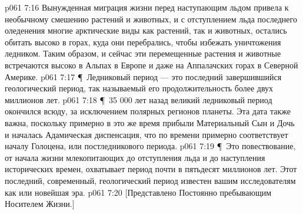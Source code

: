 \vs p061 7:16 Вынужденная миграция жизни перед наступающим льдом привела к необычному смешению растений и животных, и с отступлением льда последнего оледенения многие арктические виды как растений, так и животных, остались обитать высоко в горах, куда они перебрались, чтобы избежать уничтожения ледником. Таким образом, и сейчас эти перемещенные растения и животные встречаются высоко в Альпах в Европе и даже на Аппалачских горах в Северной Америке.
\vs p061 7:17 \P\ Ледниковый период --- это последний завершившийся геологический период, так называемый  его продолжительность более двух миллионов лет.
\vs p061 7:18 \P\ 35 000 лет назад великий ледниковый период окончился всюду, за исключением полярных регионов планеты. Эта дата также важна, поскольку примерно в это же время прибыли Материальный Сын и Дочь и началась Адамическая диспенсация, что по времени примерно соответствует началу Голоцена, или постледникового периода.
\vs p061 7:19 \P\ Это повествование, от начала жизни млекопитающих до отступления льда и до наступления исторических времен, охватывает период почти в пятьдесят миллионов лет. Этот последний, современный, геологический период известен вашим исследователям как  или новейшая эра.
\vs p061 7:20 [Представлено Постоянно пребывающим Носителем Жизни.]
